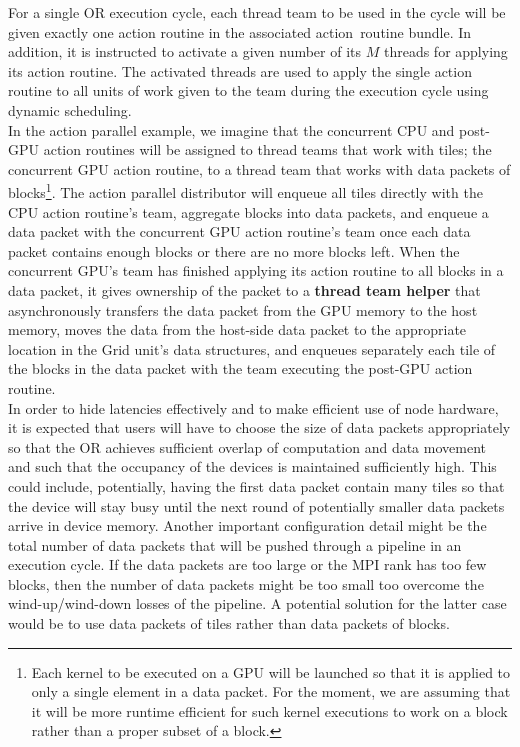 \documentclass{article}
\newcommand{\shortOR}   {OR\xspace}
\newcommand{\OR}        {\shortOR}
\newcommand{\qsaa}                   {action\ }                 %
\newcommand{\actionroutinebundle}  {\qsaa routine bundle\xspace}  %
\newcommand{\actionroutine}        {action routine\xspace}       %
\newcommand{\actionroutines}       {action routines\xspace}
\begin{document}
For a single \OR execution cycle, each thread team to be used in the cycle
will be given exactly one \actionroutine in the associated \actionroutinebundle.  In addition, it
is instructed to activate a given number of its $M$ threads for applying its
\actionroutine.  The activated threads are used to apply the single \actionroutine to all units of
work given to the team during the execution cycle using dynamic scheduling.\\

In the action parallel example, we imagine that the concurrent CPU and post-GPU
\actionroutines will be assigned to thread teams that work with tiles; the
concurrent GPU \actionroutine, to a thread team that works with data packets of
blocks\footnote{Each kernel to be executed on a GPU will be launched so that it
is applied to only a single element in a data packet.  For the moment, we are
assuming that it will be more runtime efficient for such kernel executions to
work on a block rather than a proper subset of a block.}.  The action parallel
distributor will enqueue all tiles directly with the CPU \actionroutine's team,
aggregate blocks into data packets, and enqueue a data packet with the
concurrent GPU \actionroutine's team once each data packet contains enough
blocks or there are no more blocks left.  When the concurrent GPU's team has
finished applying its \actionroutine to all blocks in a data packet, it gives
ownership of the packet to a \textbf{thread team helper} that asynchronously
transfers the data packet from the GPU memory to the host memory, moves the data
from the host-side data packet to the appropriate location in the Grid unit's
data structures, and enqueues separately each tile of the blocks in the data
packet with the team executing the post-GPU \actionroutine.\\

In order to hide latencies effectively and to make efficient use of node
hardware, it is expected that users will have to choose the size of data packets
appropriately so that the \OR achieves sufficient overlap of computation and
data movement and such that the occupancy of the devices is maintained
sufficiently high.  This could include, potentially, having the first data
packet contain many tiles so that the device
will stay busy until the next round of potentially smaller data packets arrive
in device memory.  Another important configuration detail might be the total
number of data packets that will be pushed through a pipeline in an execution
cycle.  If the data packets are too large or the MPI rank has too few blocks,
then the number of data packets might be too small too overcome the
wind-up/wind-down losses of the pipeline.  A potential solution for the latter
case would be to use data packets of tiles rather than data packets of blocks.\\
\end{document}
